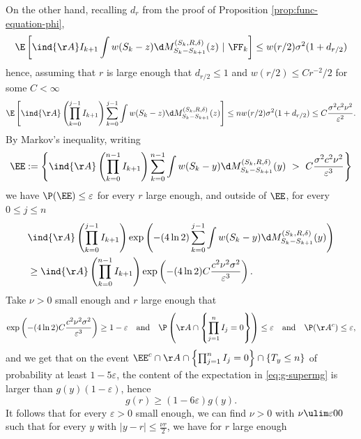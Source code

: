 \documentclass[10pt,a4paper]{article}
\begin{document}
On the other hand, recalling $d_r$ from the proof of Proposition \ref{prop:func-equation-phi}, 
\[ \E\left[ \ind{\AA} I_{k+1} \int w(S_k-z) \d M_{S_k-S_{k+1}}^{(S_k, R, \delta)}(z) \ | \ \FF_k \right] \leq w(r/2) \sigma^2 (1+d_{r/2}) \]
hence, assuming that $r$ is large enough that $d_{r/2}\leq 1$ and $w(r/2)\leq C r^{-2} / 2$ for some $C<\infty$
\[ \E\left[ \ind{\AA} \left(\prod_{k=0}^{j-1} I_{k+1}\right) \sum_{k=0}^{j-1} \int w(S_k-z) \d M_{S_k-S_{k+1}}^{(S_k, R, \delta)}(z) \right] \leq n w(r/2)\sigma^2 (1+d_{r/2}) \leq C \frac{\sigma^2 c^2 \nu^2}{\varepsilon^2} . \]
By Markov’s inequality, writing 
\[ \EE := \left\{ \ind{\AA} \left(\prod_{k=0}^{n-1} I_{k+1}\right) \sum_{k=0}^{n-1} \int w(S_k-y) \d M_{S_k-S_{k+1}}^{(S_k, R, \delta)}(y) \ > \ C \frac{\sigma^2 c^2 \nu^2}{\varepsilon^3} \right\} \]
we have $\P(\EE)\leq \varepsilon$ for every $r$ large enough, and outside of $\EE$, for every $0\leq j \leq n$
\begin{align*}
& \ind{\AA} \left(\prod_{k=0}^{j-1} I_{k+1}\right) \exp\left( - (4\ln 2)  \sum_{k=0}^{j-1} \int w(S_k-y) \d M_{S_k-S_{k+1}}^{(S_k, R, \delta)}(y) \right) \\
&\geq \ind{\AA}\left(\prod_{k=0}^{n-1} I_{k+1}\right) \exp\left( - (4\ln 2)  C \frac{c^2 \nu^2 \sigma^2}{\varepsilon^3} \right) .
\end{align*}
Take $\nu>0$ small enough and $r$ large enough that
\[ \exp\left( - (4\ln 2) C\frac{c^2 \nu^2 \sigma^2}{\varepsilon^3} \right) \geq 1-\varepsilon 
\quad \text{and} \quad 
\P\left(\AA \cap \left\{\prod_{j=1}^{n} I_j = 0 \right\}\right) \leq \varepsilon
\quad \text{and} \quad 
\P(\AA^c) \leq \varepsilon, 
\] 
and we get that on the event $\EE^c \cap \AA \cap \left\{\prod_{j=1}^{n} I_j = 0 \right\} \cap \{T_y\leq n\}$ of probability at least $1-5\varepsilon$, the content of the expectation in \eqref{eq:g-supermg} is larger than $g(y)(1-\varepsilon) $, hence 
\[ g(r) \geq (1-6\varepsilon) g(y) . \]
It follows that for every $\varepsilon>0$ small enough, we can find $\nu>0$ with $\nu\ulim \varepsilon 0 0$ such that for every $y$ with $|y-r|\leq \frac{\nu r}{2}$, we have for $r$ large enough 
\end{document}
